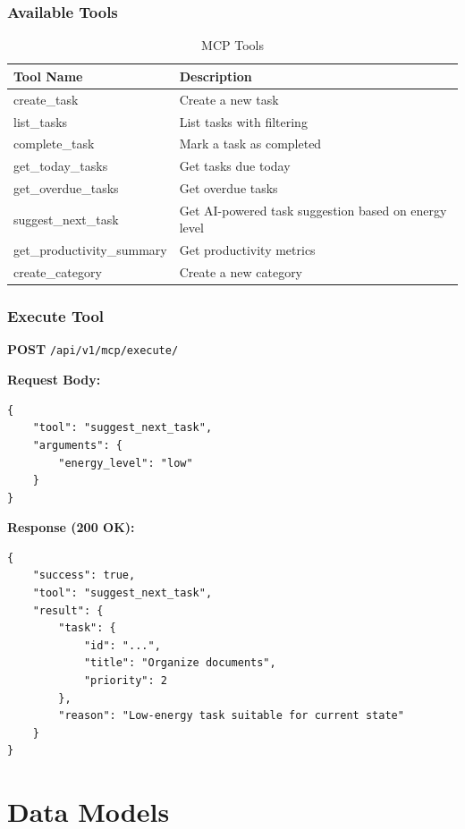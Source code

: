 \documentclass[11pt,a4paper]{article}
\begin{document}
\subsubsection{Available Tools}

\begin{table}[H]
\centering
\small
\begin{tabular}{@{}lp{8cm}@{}}
\toprule
\textbf{Tool Name} & \textbf{Description} \\
\midrule
create\_task & Create a new task \\
list\_tasks & List tasks with filtering \\
complete\_task & Mark a task as completed \\
get\_today\_tasks & Get tasks due today \\
get\_overdue\_tasks & Get overdue tasks \\
suggest\_next\_task & Get AI-powered task suggestion based on energy level \\
get\_productivity\_summary & Get productivity metrics \\
create\_category & Create a new category \\
\bottomrule
\end{tabular}
\caption{MCP Tools}
\end{table}

\subsubsection{Execute Tool}

\textbf{POST} \texttt{/api/v1/mcp/execute/}

\textbf{Request Body:}
\begin{lstlisting}[style=json]
{
    "tool": "suggest_next_task",
    "arguments": {
        "energy_level": "low"
    }
}
\end{lstlisting}

\textbf{Response (200 OK):}
\begin{lstlisting}[style=json]
{
    "success": true,
    "tool": "suggest_next_task",
    "result": {
        "task": {
            "id": "...",
            "title": "Organize documents",
            "priority": 2
        },
        "reason": "Low-energy task suitable for current state"
    }
}
\end{lstlisting}

\section{Data Models}
\end{document}
